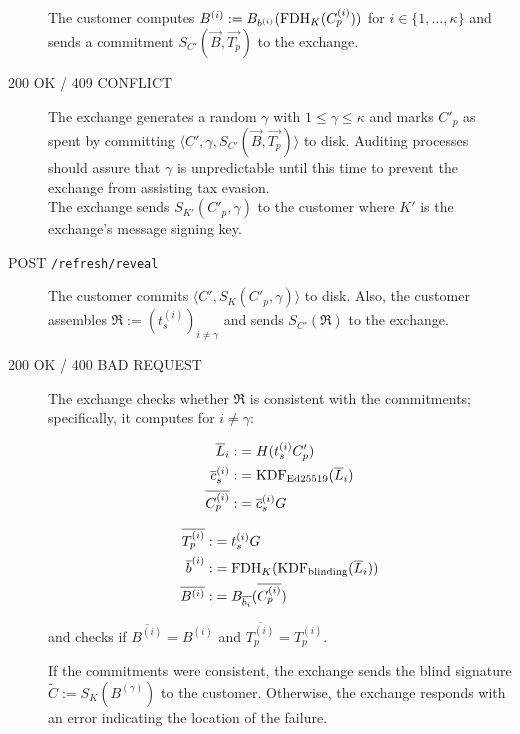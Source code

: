 \documentclass{llncs}
\begin{document}
\begin{description}
    The customer computes $B^{(i)} := B_{b^{(i)}}(\textrm{FDH}_K(C^{(i)}_p))$
    for $i \in \{1,\ldots,\kappa\}$ and sends a commitment
     $S_{C'}(\vec{B}, \vec{T_p})$ to the exchange.
  \item[200 OK / 409 CONFLICT]
    The exchange generates a random $\gamma$ with $1 \le \gamma \le \kappa$ and
    marks $C'_p$ as spent by committing
    $\langle C', \gamma, S_{C'}(\vec{B}, \vec{T_p}) \rangle$ to disk.
    Auditing processes should assure that $\gamma$ is unpredictable until
    this time to prevent the exchange from assisting tax evasion. \\
    The exchange sends $S_{K'}(C'_p, \gamma)$ to the customer where
    $K'$ is the exchange's message signing key.
  \item[POST {\tt /refresh/reveal}]
    The customer commits $\langle C', S_K(C'_p, \gamma) \rangle$ to disk.
    Also, the customer assembles
      $\mathfrak{R} := \left(t_s^{(i)}\right)_{i \ne \gamma}$
    and sends $S_{C'}(\mathfrak{R})$ to the exchange.
  \item[200 OK / 400 BAD REQUEST]  %
    The exchange checks whether $\mathfrak{R}$ is consistent with
    the commitments; specifically, it computes for $i \not= \gamma$:

    \vspace{-2ex}
    \begin{minipage}{5cm}
    \begin{align*}
      \overline{L}_i :&= H(t_s^{(i)} C_p') \\
      \overline{c}_s^{(i)} :&= \textrm{KDF}_{\textrm{Ed25519}}(\overline{L}_i) \\
      \overline{C^{(i)}_p} :&= \overline{c}_s^{(i)} G
     \end{align*}
    \end{minipage}
    \begin{minipage}{5cm}
     \begin{align*}
       \overline{T_p^{(i)}} :&= t_s^{(i)} G \\
       \overline{b}^{(i)} :&= \textrm{FDH}_K(\textrm{KDF}_{\textrm{blinding}}(\overline{L}_i)) \\
       \overline{B^{(i)}} :&= B_{\overline{b_i}}(\overline{C_p^{(i)}})
     \end{align*}
    \end{minipage}

    and checks if $\overline{B^{(i)}} = B^{(i)}$
    and $\overline{T^{(i)}_p} = T^{(i)}_p$.

    If the commitments were consistent, the exchange sends the
    blind signature $\widetilde{C} := S_{K}(B^{(\gamma)})$ to the customer.
    Otherwise, the exchange responds with an error indicating
     the location of the failure.
\end{description}
\end{document}
